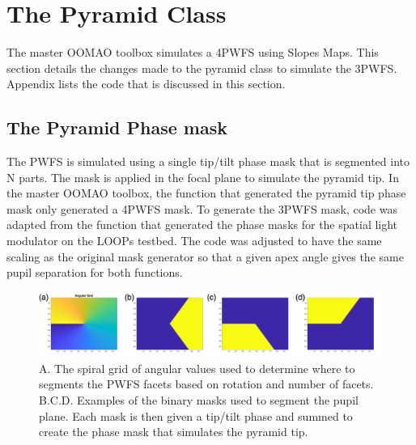                         





\section{The Pyramid Class}
The master OOMAO toolbox simulates a 4PWFS using Slopes Maps. This section details the changes made to the pyramid class to simulate the 3PWFS. Appendix \label{OOMAOcode} lists the code that is discussed in this section. 


\subsection{The Pyramid Phase mask}
The PWFS is simulated using a single tip/tilt phase mask that is segmented into N parts. The mask is applied in the focal plane to simulate the pyramid tip. In the master OOMAO toolbox, the function that generated the pyramid tip phase mask only generated a 4PWFS mask. To generate the 3PWFS mask, code was adapted from the function that generated the phase masks for the spatial light modulator on the LOOPs testbed. The code was adjusted to have the same scaling as the original mask generator so that a given apex angle gives the same pupil separation for both functions.
\begin{figure}
    \centering
    \includegraphics[width=1\textwidth]{Chapter Materials/Chapter Four Materials/phaseMask.png}
    \caption{A. The spiral grid of angular values used to determine where to segments the PWFS facets based on rotation and number of facets. B.C.D. Examples of the binary masks used to segment the pupil plane. Each mask is then given a tip/tilt phase and summed to create the phase mask that simulates the pyramid tip. }
    \label{fig:phaseMask}
\end{figure}

